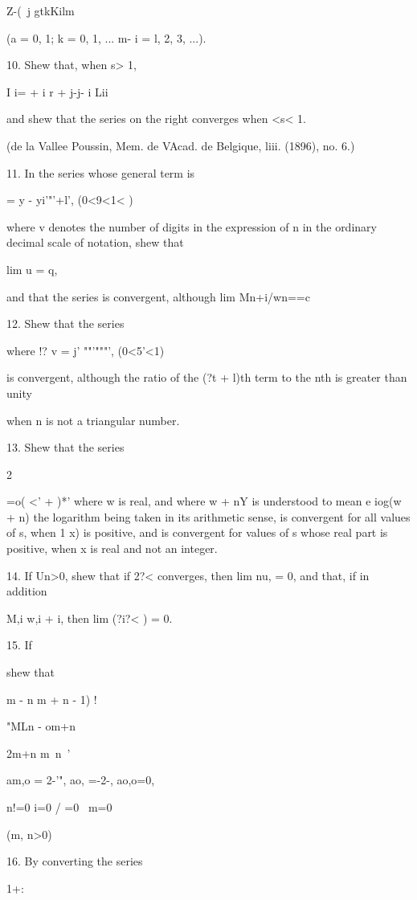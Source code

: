 Z-(\ j gtkKilm

(a = 0, 1; k = 0, 1, ... m-\; i = l, 2, 3, ...).

10. Shew that, when s> 1,

I i= + i r + j-j- i Lii

and shew that the series on the right converges when <s< 1.

(de la Vallee Poussin, Mem. de VAcad. de Belgique, liii. (1896), no.
6.)

11. In the series whose general term is

   = y - yi'"'+l', (0<9<1< )

where v denotes the number of digits in the expression of n in the
ordinary decimal scale of notation, shew that

lim u = q,

and that the series is convergent, although lim Mn+i/wn==c

12. Shew that the series

where !? v = j' ""'"""', (0<5'<1)

is convergent, although the ratio of the (?t + l)th term to the nth is
greater than unity

when n is not a triangular number. 

13. Shew that the series

2

 =o( <' + )*' where w is real, and where w + nY is understood to mean
e iog(w + n) the logarithm being taken in its arithmetic sense, is
convergent for all values of s, when 1 x) is positive, and is
convergent for values of s whose real part is positive, when x is real
and not an integer.

14. If Un>0, shew that if 2?< converges, then lim nu, = 0, and that,
if in addition

M,i w,i + i, then lim (?i?< ) = 0.

15. If

shew that

m - n m + n - 1) !

"MLn - om+n

2m+n m\ n\ '

am,o = 2-'", ao, =-2-, ao,o=0,

n!=0 i=0 / =0 \ m=0

(m, n>0)


16. By converting the series

1+:

